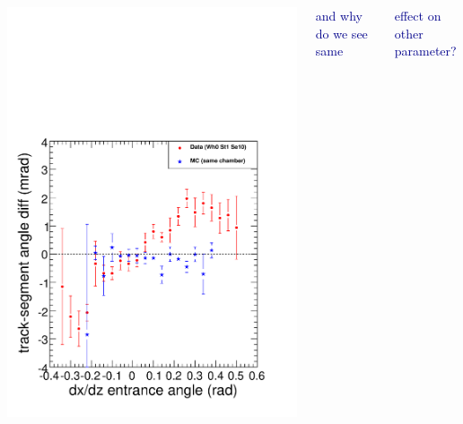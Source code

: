 \documentclass[compress]{beamer}
\begin{document}
\begin{frame}
\begin{columns}
\includegraphics[width=\linewidth]{strange_correlation.pdf}

\hfill \textcolor{darkblue}{and why do we see same} \hspace{0.07 cm}

\hfill \textcolor{darkblue}{effect on other parameter?}


\end{columns}
\end{frame}
\end{document}
